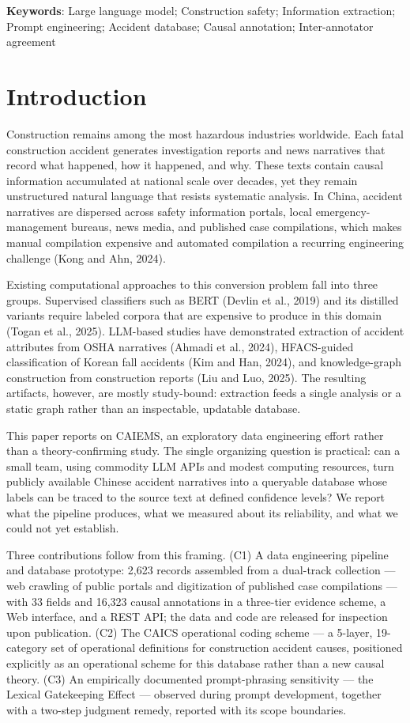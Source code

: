 \documentclass[11pt]{article}
\begin{document}
\textbf{Keywords}: Large language model; Construction safety; Information extraction; Prompt engineering; Accident database; Causal annotation; Inter-annotator agreement

\section{Introduction}
Construction remains among the most hazardous industries worldwide. Each fatal construction accident generates investigation reports and news narratives that record what happened, how it happened, and why. These texts contain causal information accumulated at national scale over decades, yet they remain unstructured natural language that resists systematic analysis. In China, accident narratives are dispersed across safety information portals, local emergency-management bureaus, news media, and published case compilations, which makes manual compilation expensive and automated compilation a recurring engineering challenge (Kong and Ahn, 2024).

Existing computational approaches to this conversion problem fall into three groups. Supervised classifiers such as BERT (Devlin et al., 2019) and its distilled variants require labeled corpora that are expensive to produce in this domain (Togan et al., 2025). LLM-based studies have demonstrated extraction of accident attributes from OSHA narratives (Ahmadi et al., 2024), HFACS-guided classification of Korean fall accidents (Kim and Han, 2024), and knowledge-graph construction from construction reports (Liu and Luo, 2025). The resulting artifacts, however, are mostly study-bound: extraction feeds a single analysis or a static graph rather than an inspectable, updatable database.

This paper reports on CAIEMS, an exploratory data engineering effort rather than a theory-confirming study. The single organizing question is practical: can a small team, using commodity LLM APIs and modest computing resources, turn publicly available Chinese accident narratives into a queryable database whose labels can be traced to the source text at defined confidence levels? We report what the pipeline produces, what we measured about its reliability, and what we could not yet establish.

Three contributions follow from this framing. (C1) A data engineering pipeline and database prototype: 2,623 records assembled from a dual-track collection --- web crawling of public portals and digitization of published case compilations --- with 33 fields and 16,323 causal annotations in a three-tier evidence scheme, a Web interface, and a REST API; the data and code are released for inspection upon publication. (C2) The CAICS operational coding scheme --- a 5-layer, 19-category set of operational definitions for construction accident causes, positioned explicitly as an operational scheme for this database rather than a new causal theory. (C3) An empirically documented prompt-phrasing sensitivity --- the Lexical Gatekeeping Effect --- observed during prompt development, together with a two-step judgment remedy, reported with its scope boundaries.
\end{document}

